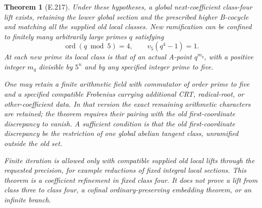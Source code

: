 \documentclass[11pt]{article}
\newtheorem{theorem}{Theorem}
\begin{document}
\begin{theorem}[E.217]
Under these hypotheses, a global next-coefficient class-four lift exists, retaining the lower global section and the prescribed higher B-cocycle and matching all the supplied old local classes. New ramification can be confined to finitely many arbitrarily large primes $q$ satisfying
\[
 \operatorname{ord}(q\bmod5)=4,
 \qquad v_5(q^4-1)=1.
 \tag{1}
\]
At each new prime its local class is that of an actual A-point $q^{m_q}$, with a positive integer $m_q$ divisible by $5^n$ and by any specified integer prime to five.

One may retain a finite arithmetic field with commutator of order prime to five and a specified compatible Frobenius carrying additional CRT, radical-root, or other-coefficient data. In that version the exact remaining arithmetic characters are retained; the theorem requires their pairing with the old first-coordinate discrepancy to vanish. A sufficient condition is that the old first-coordinate discrepancy be the restriction of one global abelian tangent class, unramified outside the old set.

Finite iteration is allowed only with compatible supplied old local lifts through the requested precision, for example reductions of fixed integral local sections. This theorem is a coefficient refinement in fixed class four. It does not prove a lift from class three to class four, a cofinal ordinary-preserving embedding theorem, or an infinite branch.
\end{theorem}
\end{document}
